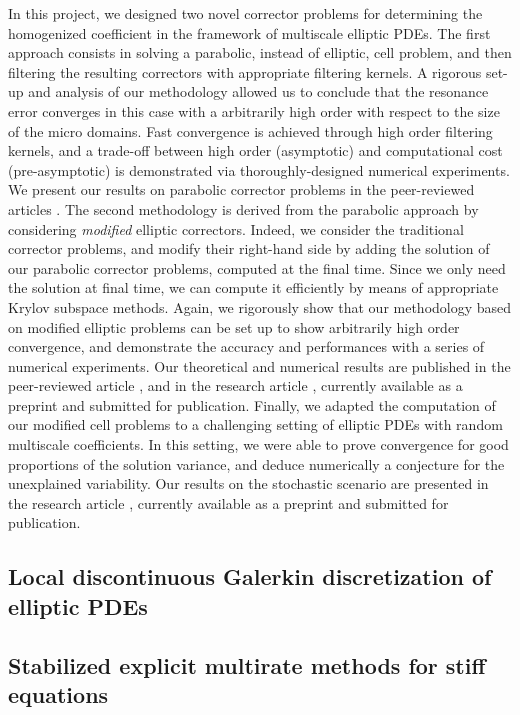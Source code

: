 \documentclass[10pt]{article}
\begin{document}
In this project, we designed two novel corrector problems for determining the homogenized coefficient in the framework of multiscale elliptic PDEs. The first approach consists in solving a parabolic, instead of elliptic, cell problem, and then filtering the resulting correctors with appropriate filtering kernels. A rigorous set-up and analysis of our methodology allowed us to conclude that the resonance error converges in this case with a arbitrarily high order with respect to the size of the micro domains. Fast convergence is achieved through high order filtering kernels, and a trade-off between high order (asymptotic) and computational cost (pre-asymptotic) is demonstrated via thoroughly-designed numerical experiments. We present our results on parabolic corrector problems in the peer-reviewed articles \cite{AAP19,AAP21}. The second methodology is derived from the parabolic approach by considering \textit{modified} elliptic correctors. Indeed, we consider the traditional corrector problems, and modify their right-hand side by adding the solution of our parabolic corrector problems, computed at the final time. Since we only need the solution at final time, we can compute it efficiently by means of appropriate Krylov subspace methods. Again, we rigorously show that our methodology based on modified elliptic problems can be set up to show arbitrarily high order convergence, and demonstrate the accuracy and performances with a series of numerical experiments. Our theoretical and numerical results are published in the peer-reviewed article \cite{AAP19}, and in the research article \cite{AAP20}, currently available as a preprint and submitted for publication. Finally, we adapted the computation of our modified cell problems to a challenging setting of elliptic PDEs with random multiscale coefficients. In this setting, we were able to prove convergence for good proportions of the solution variance, and deduce numerically a conjecture for the unexplained variability. Our results on the stochastic scenario are presented in the research article \cite{AAP20b}, currently available as a preprint and submitted for publication.

\subsection{Local discontinuous Galerkin discretization of elliptic PDEs}\label{sec:Rosilho_1}

\subsection{Stabilized explicit multirate methods for stiff equations}\label{sec:Rosilho_2}
\end{document}
